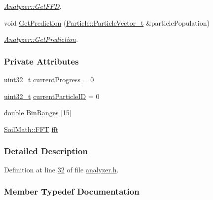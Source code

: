 \begin{DoxyCompactItemize}
\begin{DoxyCompactList}\small\item\em \hyperlink{class_soil_analyzer_1_1_analyzer_aeed5e3b158ff37d5fecb2816e12c3c31}{Analyzer\+::\+Get\+F\+F\+D}. \end{DoxyCompactList}\item 
void \hyperlink{class_soil_analyzer_1_1_analyzer_a7eb1a2676660f536b366f9aaf1326f80}{Get\+Prediction} (\hyperlink{class_soil_analyzer_1_1_particle_a4e43dab999d36d5a5f809bb4be5ff3a7}{Particle\+::\+Particle\+Vector\+\_\+t} \&particle\+Population)
\begin{DoxyCompactList}\small\item\em \hyperlink{class_soil_analyzer_1_1_analyzer_a7eb1a2676660f536b366f9aaf1326f80}{Analyzer\+::\+Get\+Prediction}. \end{DoxyCompactList}\end{DoxyCompactItemize}
\subsubsection*{Private Attributes}
\begin{DoxyCompactItemize}
\item 
\hyperlink{_soil_math_types_8h_a435d1572bf3f880d55459d9805097f62}{uint32\+\_\+t} \hyperlink{class_soil_analyzer_1_1_analyzer_a068a9d419064799836bb8caff60a2141}{current\+Progress} = 0
\item 
\hyperlink{_soil_math_types_8h_a435d1572bf3f880d55459d9805097f62}{uint32\+\_\+t} \hyperlink{class_soil_analyzer_1_1_analyzer_a9cf8e0b0a007a986d2b5d1e2653e43bf}{current\+Particle\+I\+D} = 0
\item 
double \hyperlink{class_soil_analyzer_1_1_analyzer_a5a8ee87a3017f91d7624ad700d2c14c6}{Bin\+Ranges} \mbox{[}15\mbox{]}
\item 
\hyperlink{class_soil_math_1_1_f_f_t}{Soil\+Math\+::\+F\+F\+T} \hyperlink{class_soil_analyzer_1_1_analyzer_a5a88bb8ae9ce9a8a1e199f3760f9db48}{fft}
\end{DoxyCompactItemize}


\subsubsection{Detailed Description}


Definition at line \hyperlink{analyzer_8h_source_l00032}{32} of file \hyperlink{analyzer_8h_source}{analyzer.\+h}.



\subsubsection{Member Typedef Documentation}
\hypertarget{class_soil_analyzer_1_1_analyzer_a55e2c84ab42cb967d718dd18295c1f91}{}
